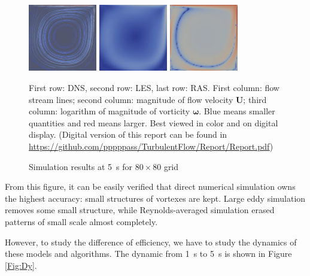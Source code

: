 \documentclass[english, nochinese]{pkupaper}
\begin{document}
\begin{figure}[htbp]
{{
\includegraphics[width=3cm]{Results/Figure01h.pdf}
\includegraphics[width=3cm]{Results/Figure01g.pdf}
\includegraphics[width=3cm]{Results/Figure02o.pdf}
}
\caption{Simulation results at \SI{5}{s} for $ 80 \times 80 $ grid}
\label{Fig:Over}
}
{
\footnotesize
First row: DNS, second row: LES, last row: RAS. First column: flow stream lines; second column: magnitude of flow velocity $\mathbf{U}$; third column: logarithm of magnitude of vorticity $\bm{\omega}$. Blue means smaller quantities and red means larger. Best viewed in color and on digital display. (Digital version of this report can be found in \url{https://github.com/pppppass/TurbulentFlow/Report/Report.pdf})
}
\end{figure}

From this figure, it can be easily verified that direct numerical simulation owns the highest accuracy: small structures of vortexes are kept. Large eddy simulation removes some small structure, while Reynolds-averaged simulation erased patterns of small scale almost completely.

However, to study the difference of efficiency, we have to study the dynamics of these models and algorithms. The dynamic from \SI{1}{\second} to \SI{5}{\second} is shown in Figure \ref{Fig:Dy}.
\end{document}
